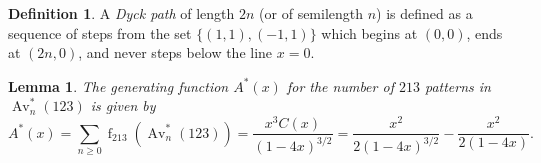 \documentclass[11pt]{article} %
\theoremstyle{plain}
\newtheorem{lemma}[theorem]{Lemma}
\theoremstyle{definition}
\newtheorem{definition}[theorem]{Definition}
\newcommand{\Avns}{\Av_n^*(123)}
\DeclareMathOperator{\Av}{Av}
\DeclareMathOperator{\num}{f}
\begin{document}
  \begin{definition}
    A \emph{Dyck path} of length $2n$ (or of semilength $n$) is
    defined as a sequence of steps from the set $\{(1,1),(-1,1)\}$
    which begins at $(0,0)$, ends at $(2n,0)$, and never steps below
    the line $x=0$.
  \end{definition}

  \begin{lemma} \label{biglemma}
    The generating function $A^*(x)$ for the number of $213$ patterns in
    $\Avns$ is given by
    $$ A^*(x) = \sum_{n\geq 0} \num_{213}(\Avns) =
    \frac{x^3C(x)}{(1-4x)^{3/2}} = \frac{x^2}{2(1-4x)^{3/2}} -
    \frac{x^2}{2(1-4x)}.$$
  \end{lemma}
\end{document}
